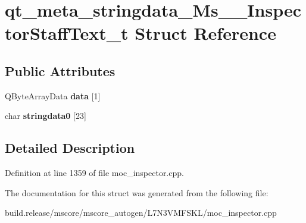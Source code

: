 \hypertarget{structqt__meta__stringdata___ms_____inspector_staff_text__t}{}\section{qt\+\_\+meta\+\_\+stringdata\+\_\+\+Ms\+\_\+\+\_\+\+Inspector\+Staff\+Text\+\_\+t Struct Reference}
\label{structqt__meta__stringdata___ms_____inspector_staff_text__t}
\subsection*{Public Attributes}
\begin{DoxyCompactItemize}
\item 
\mbox{\label{structqt__meta__stringdata___ms_____inspector_staff_text__t_a824eba2c346f8749a8d9ffa8d32a75f0}} 
Q\+Byte\+Array\+Data {\bfseries data} \mbox{[}1\mbox{]}
\item 
\mbox{\label{structqt__meta__stringdata___ms_____inspector_staff_text__t_a3aeeb3161fb97f98690067e4d8589d3c}} 
char {\bfseries stringdata0} \mbox{[}23\mbox{]}
\end{DoxyCompactItemize}


\subsection{Detailed Description}


Definition at line 1359 of file moc\+\_\+inspector.\+cpp.



The documentation for this struct was generated from the following file\+:\begin{DoxyCompactItemize}
\item 
build.\+release/mscore/mscore\+\_\+autogen/\+L7\+N3\+V\+M\+F\+S\+K\+L/moc\+\_\+inspector.\+cpp\end{DoxyCompactItemize}
